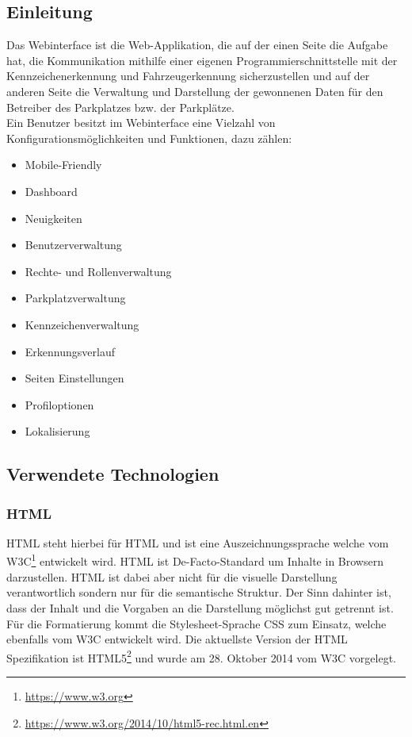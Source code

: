 \def \sectionauthors {Philipp Kraft}

\subsection{Einleitung}
Das Webinterface ist die Web-Applikation, die auf der einen Seite die Aufgabe hat,
die Kommunikation mithilfe einer eigenen Programmierschnittstelle mit der
Kennzeichenerkennung und Fahrzeugerkennung sicherzustellen und auf der anderen
Seite die Verwaltung und Darstellung der gewonnenen Daten für den Betreiber des
Parkplatzes bzw. der Parkplätze.\\

Ein Benutzer besitzt im Webinterface eine Vielzahl von
Konfigurationsmöglichkeiten und Funktionen, dazu zählen:

\begin{itemize}
  \item Mobile-Friendly
  \item Dashboard
  \item Neuigkeiten
  \item Benutzerverwaltung
  \item Rechte- und Rollenverwaltung
  \item Parkplatzverwaltung
  \item Kennzeichenverwaltung
  \item Erkennungsverlauf
  \item Seiten Einstellungen
  \item Profiloptionen
  \item Lokalisierung
\end{itemize}

\subsection{Verwendete Technologien}
\subsubsection{HTML}
\acs*{HTML} steht hierbei für \acl*{HTML} und ist eine Auszeichnungssprache
welche vom \ac*{W3C}\footnote{\url{https://www.w3.org} } entwickelt wird.
\ac*{HTML} ist De-Facto-Standard um Inhalte in Browsern darzustellen.
\acs*{HTML} ist dabei aber nicht für die visuelle Darstellung verantwortlich
sondern nur für die semantische Struktur. Der Sinn dahinter ist, dass der Inhalt
und die Vorgaben an die Darstellung möglichst gut getrennt ist. Für die
Formatierung kommt die Stylesheet-Sprache \ac*{CSS} zum Einsatz, welche
ebenfalls vom \acl*{W3C} entwickelt wird. Die aktuellste Version der \acs*{HTML}
Spezifikation ist
HTML5\footnote{\url{https://www.w3.org/2014/10/html5-rec.html.en}} und wurde am
28. Oktober 2014 vom \acs*{W3C} vorgelegt.

